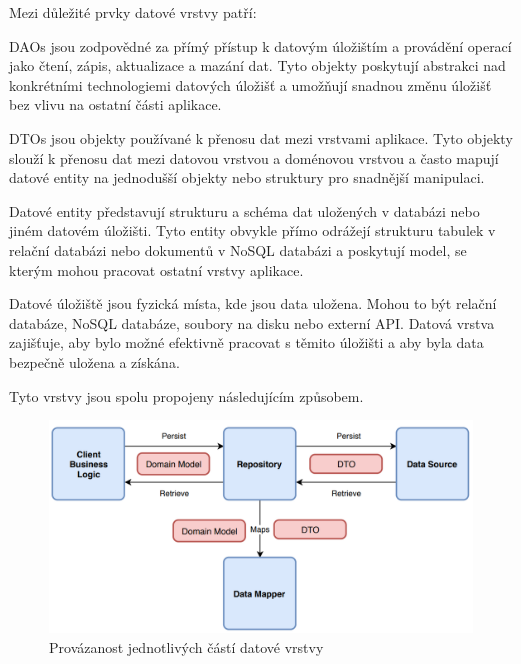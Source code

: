 
Mezi důležité prvky datové vrstvy patří:

DAOs jsou zodpovědné za přímý přístup k datovým úložištím a provádění operací jako čtení, zápis, aktualizace a mazání dat. Tyto objekty 
poskytují abstrakci nad konkrétními technologiemi datových úložišť a umožňují snadnou změnu úložišť bez vlivu na ostatní části aplikace.

DTOs jsou objekty používané k přenosu dat mezi vrstvami aplikace. Tyto objekty slouží k přenosu dat mezi datovou vrstvou a doménovou 
vrstvou a často mapují datové entity na jednodušší objekty nebo struktury pro snadnější manipulaci.

Datové entity představují strukturu a schéma dat uložených v databázi nebo jiném datovém úložišti. Tyto entity obvykle přímo odrážejí
strukturu tabulek v relační databázi nebo dokumentů v NoSQL databázi a poskytují model, se kterým mohou pracovat ostatní vrstvy aplikace.

Datové úložiště jsou fyzická místa, kde jsou data uložena. Mohou to být relační databáze, NoSQL databáze, soubory na disku nebo externí API. 
Datová vrstva zajišťuje, aby bylo možné efektivně pracovat s těmito úložišti a aby byla data bezpečně uložena a získána.

\bigskip

Tyto vrstvy jsou spolu propojeny následujícím způsobem.

\begin{figure}[H]
  \centering
  \includegraphics[width=.8\textwidth]{arch_diagram.png}
  \caption{Provázanost jednotlivých částí datové vrstvy}
  \label{fig:arch_diagram}
\end{figure}

